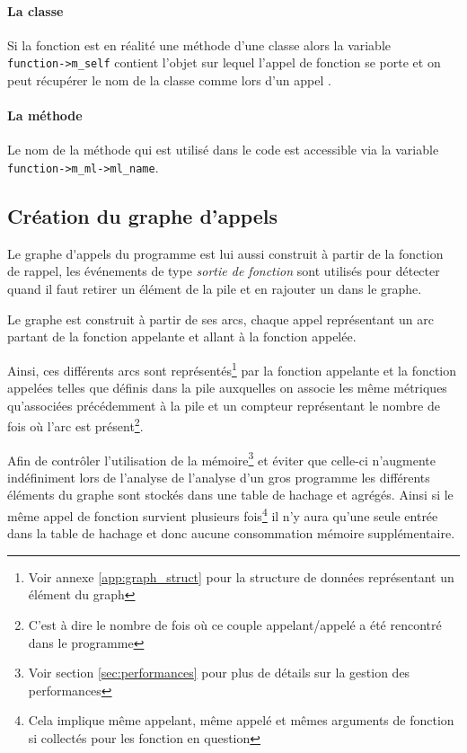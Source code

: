 \paragraph*{La classe} Si la fonction est en réalité une méthode d'une classe alors la variable\\ \verb|function->m_self| contient l'objet sur lequel l'appel de fonction se porte et on peut récupérer le nom de la classe comme lors d'un appel \Python.

\paragraph*{La méthode} Le nom de la méthode qui est utilisé dans le code \Python est accessible via la variable \verb|function->m_ml->ml_name|.
  
\subsection{Création du graphe d'appels}
\label{subsec:crea-graph-appel}
Le \gls{graphe d'appels} du programme est lui aussi construit à partir de la fonction de rappel, les événements de type \emph{sortie de fonction} sont utilisés pour détecter quand il faut retirer un élément de la pile et en rajouter un dans le graphe.

Le graphe est construit à partir de ses arcs, chaque appel représentant un arc partant de la fonction appelante et allant à la fonction appelée.

Ainsi, ces différents arcs sont représentés\footnote{Voir annexe \vref{app:graph_struct} pour la structure de données représentant un élément du graph} par la fonction appelante et la fonction appelées telles que définis dans la pile auxquelles on associe les même métriques qu'associées précédemment à la pile et un compteur représentant le nombre de fois où l'arc est présent\footnote{C'est à dire le nombre de fois où ce couple appelant/appelé a été rencontré dans le programme}.

\begin{note}
Afin de contrôler l'utilisation de la mémoire\footnote{Voir section \vref{sec:performances} pour plus de détails sur la gestion des performances} et éviter que celle-ci n'augmente indéfiniment lors de l'analyse de l'analyse d'un gros programme les différents éléments du graphe sont stockés dans une table de hachage et agrégés. Ainsi si le même appel de fonction survient plusieurs fois\footnote{Cela implique même appelant, même appelé et mêmes arguments de fonction si collectés pour les fonction en question} il n'y aura qu'une seule entrée dans la table de hachage et donc aucune consommation mémoire supplémentaire.
\end{note}


